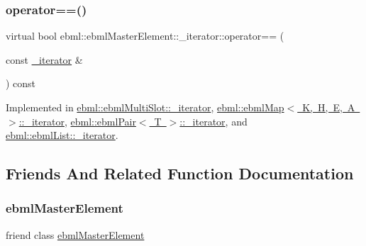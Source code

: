 \mbox{\label{classebml_1_1ebmlMasterElement_1_1__iterator_ab0b53665f686e2ae379b275110ea3c95}} 
\subsubsection{\texorpdfstring{operator==()}{operator==()}}
{\footnotesize\ttfamily virtual bool ebml\+::ebml\+Master\+Element\+::\+\_\+iterator\+::operator== (\begin{DoxyParamCaption}\item[{const \mbox{\hyperlink{classebml_1_1ebmlMasterElement_1_1__iterator}{\+\_\+iterator}} \&}]{ }\end{DoxyParamCaption}) const\hspace{0.3cm}{\ttfamily [pure virtual]}}



Implemented in \mbox{\hyperlink{classebml_1_1ebmlMultiSlot_1_1__iterator_a306e7fd7a564d17febbb08a75dd95b36}{ebml\+::ebml\+Multi\+Slot\+::\+\_\+iterator}}, \mbox{\hyperlink{classebml_1_1ebmlMap_1_1__iterator_abda291b4e2305234d8215d4a3b03e7a5}{ebml\+::ebml\+Map$<$ K, H, E, A $>$\+::\+\_\+iterator}}, \mbox{\hyperlink{classebml_1_1ebmlPair_1_1__iterator_a82853adf042b58f9432861852b33ac64}{ebml\+::ebml\+Pair$<$ T $>$\+::\+\_\+iterator}}, and \mbox{\hyperlink{classebml_1_1ebmlList_1_1__iterator_af451e7598220ae323edd778f4ca3ab21}{ebml\+::ebml\+List\+::\+\_\+iterator}}.



\subsection{Friends And Related Function Documentation}
\mbox{\label{classebml_1_1ebmlMasterElement_1_1__iterator_ad88e86cba72e9332a4693c1c6009b281}} 
\subsubsection{\texorpdfstring{ebml\+Master\+Element}{ebmlMasterElement}}
{\footnotesize\ttfamily friend class \mbox{\hyperlink{classebml_1_1ebmlMasterElement}{ebml\+Master\+Element}}\hspace{0.3cm}{\ttfamily [friend]}}

